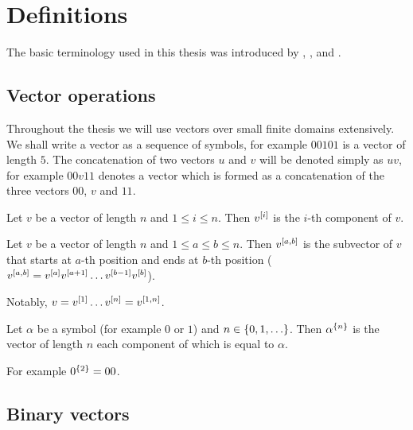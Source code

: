 \chapter{Definitions}

The basic terminology used in this thesis
was introduced by
\citet{Crama2011},
\citet{Schieber2005154},
\citet{Dubovsky2012}
and \citet{Husek2014,Husek2015}.

\section{Vector operations}

Throughout the thesis we will use vectors
over small finite domains extensively.
We shall write a vector as a sequence of symbols,
for example $00101$ is a vector of length $5$.
The concatenation of two vectors $u$ and $v$
will be denoted simply as $uv$,
for example $00v11$ denotes a vector
which is formed as a concatenation
of the three vectors $00$, $v$ and $11$.

\begin{definition}
Let $v$ be a vector of length $n$ and $1 \leq i \leq n$.
Then $v^{[i]}$ is the $i$-th component of $v$.
\end{definition}

\begin{definition}
Let
$v$ be a vector of length $n$
and
$1 \leq a \leq b \leq n$.
Then $v^{[a, b]}$ is the subvector of $v$
that starts at $a$-th position
and ends at $b$-th position
($v^{[a, b]}
= v^{[a]} v^{[a+1]}
\ldots v^{[b-1]} v^{[b]}$).
\end{definition}

Notably,
$v = v^{[1]} \ldots v^{[n]} = v^{[1, n]}$.

\begin{definition}
Let $\alpha$ be a symbol (for example $0$ or $1$)
and $n \in \{0, 1, \ldots\}$.
Then $\alpha^{\{n\}}$ is the vector of length $n$
each component of which is equal to $\alpha$.
\end{definition}

For example
$0^{\{2\}} = 00$.

\section{Binary vectors}

